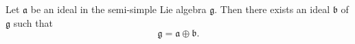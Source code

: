 Let $\mathfrak{a}$ be an ideal in the semi-simple Lie algebra $\mathfrak{g}$. Then there exists an ideal $\mathfrak{b}$ of $\mathfrak{g}$ such that
$$\mathfrak{g} = \mathfrak{a} \oplus \mathfrak{b}.$$

